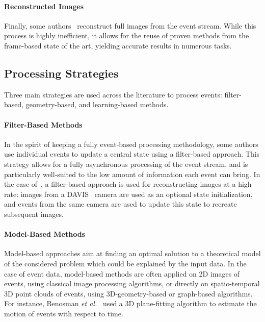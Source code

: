 \paragraph{Reconstructed Images}
Finally, some authors~\cite{Scheerlinck2018ContinuoustimeIE,Rebecq2021HighSA,Dauner2023FromCC} reconstruct full images from the event stream. While this process is highly inefficient, it allows for the reuse of proven methods from the frame-based state of the art, yielding accurate results in numerous tasks.


\subsection{Processing Strategies}
Three main strategies are used across the literature to process events: filter-based, geometry-based, and learning-based methods.

\paragraph{Filter-Based Methods}
In the spirit of keeping a fully event-based processing methodology, some authors use individual events to update a central state using a filter-based approach. This strategy allows for a fully asynchronous processing of the event stream, and is particularly well-suited to the low amount of information each event can bring. In the case of~\cite{Scheerlinck2018ContinuoustimeIE}, a filter-based approach is used for reconstructing images at a high rate: images from a DAVIS~\cite{Brandli2014A2} camera are used as an optional state initialization, and events from the same camera are used to update this state to recreate subsequent images.

\paragraph{Model-Based Methods}
Model-based approaches aim at finding an optimal solution to a theoretical model of the considered problem which could be explained by the input data. In the case of event data, model-based methods are often applied on 2D images of events, using classical image processing algorithms, or directly on spatio-temporal 3D point clouds of events, using 3D-geometry-based or graph-based algorithms. For instance, Benosman \textit{et al.}~\cite{Benosman2014EventBasedVF} used a 3D plane-fitting algorithm to estimate the motion of events with respect to time.

